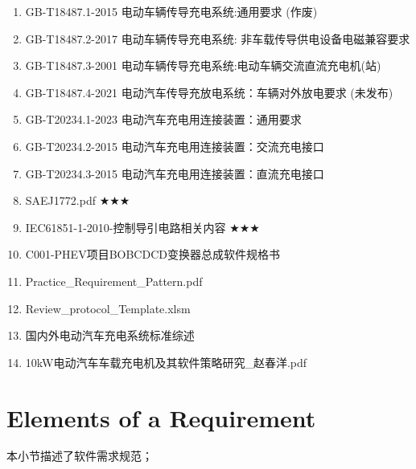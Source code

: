 	\begin{enumerate}
		\item   GB-T18487.1-2015 电动车辆传导充电系统:通用要求\cite{GB18487_1} \textcolor{myred}{(作废)}
		\item 	GB-T18487.2-2017 电动车辆传导充电系统: 非车载传导供电设备电磁兼容要求\cite{GB18487_2}
		\item   GB-T18487.3-2001 电动车辆传导充电系统:电动车辆交流直流充电机(站)\cite{GB18487_3} 
		\item 	GB-T18487.4-2021 电动汽车传导充放电系统：车辆对外放电要求\cite{GB18487_4}  \textcolor{myred}{(未发布)}
		\item   GB-T20234.1-2023 电动汽车充电用连接装置：通用要求\cite{GB20234_1}
		\item   GB-T20234.2-2015 电动汽车充电用连接装置：交流充电接口\cite{GB20234_2}
		\item   GB-T20234.3-2015 电动汽车充电用连接装置：直流充电接口\cite{GB20234_3}
		\item   SAEJ1772.pdf\cite{SAE} $\bigstar \bigstar \bigstar$ 
		\item   IEC61851-1-2010-控制导引电路相关内容\cite{IEC61851} $\bigstar \bigstar \bigstar$
		\item   C001-PHEV项目BOBCDCD变换器总成软件规格书\cite{PHEV}
		\item   Practice\_Requirement\_Pattern.pdf\cite{Pattern}
		\item 	Review\_protocol\_Template.xlsm\cite{Review}
		\item   国内外电动汽车充电系统标准综述\cite{zs}
		\item   10kW电动汽车车载充电机及其软件策略研究\_赵春洋.pdf\cite{zhao}
	\end{enumerate}
 
\newpage
\section{Elements of a Requirement}
	本小节描述了软件需求规范；

